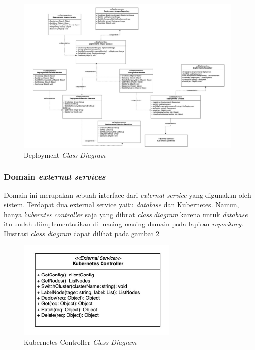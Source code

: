 \begin{figure}[ht]
  \centering
  \includegraphics[width=1\textwidth]{resources/chapter-3/class/deployment-class-diagram.jpg}
  \caption{Deployment \textit{Class Diagram}}
  \label{fig:deployment-class-diagram}
\end{figure}

\subsubsection{Domain \textit{external services}}

Domain ini merupakan sebuah interface dari \textit{external service} yang digunakan oleh sistem. Terdapat dua external service yaitu \textit{database} dan Kubernetes. Namun, hanya \textit{kuberntes controller} saja yang dibuat \textit{class diagram} karena untuk \textit{database} itu sudah diimplementasikan di masing masing domain pada lapisan \textit{repository}. Ilustrasi \textit{class diagram} dapat dilihat pada gambar \ref{fig:kubernetes-controller-class-diagram}

\begin{figure}[ht]
  \centering
  \includegraphics[width=0.7\textwidth]{resources/chapter-3/class/kubernetes-controller}
  \caption{Kubernetes Controller \textit{Class Diagram}}
  \label{fig:kubernetes-controller-class-diagram}
\end{figure}